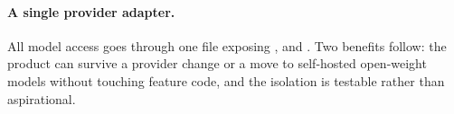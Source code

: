 \paragraph{A single provider adapter.} All model access goes through one file exposing
,  and . Two benefits follow: the product
can survive a provider change or a move to self-hosted open-weight models without touching
feature code, and the isolation is testable rather than aspirational.
